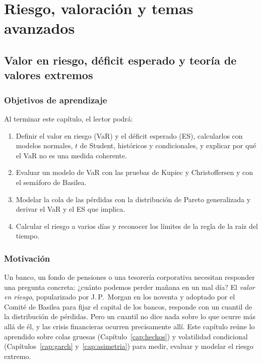 \part{Riesgo, valoración y temas avanzados}
\chapter[Valor en riesgo y valores extremos]{Valor en riesgo, déficit esperado y teoría de valores extremos}\label{cap:var_riesgo}

\section*{Objetivos de aprendizaje}
Al terminar este capítulo, el lector podrá:
\begin{enumerate}[label=\arabic*.,leftmargin=*]
  \item Definir el valor en riesgo (VaR) y el déficit esperado (ES), calcularlos con modelos normales, $t$ de
        Student, históricos y condicionales, y explicar por qué el VaR no es una medida coherente.
  \item Evaluar un modelo de VaR con las pruebas de Kupiec y Christoffersen y con el semáforo de Basilea.
  \item Modelar la cola de las pérdidas con la distribución de Pareto generalizada y derivar el VaR y el ES
        que implica.
  \item Calcular el riesgo a varios días y reconocer los límites de la regla de la raíz del tiempo.
\end{enumerate}

\section*{Motivación}
Un banco, un fondo de pensiones o una tesorería corporativa necesitan responder una pregunta concreta: ¿cuánto
podemos perder mañana en un mal día? El \emph{valor en riesgo}, popularizado por J.\,P.~Morgan en los noventa y
adoptado por el Comité de Basilea para fijar el capital de los bancos, responde con un cuantil de la distribución
de pérdidas. Pero un cuantil no dice nada sobre lo que ocurre más allá de él, y las crisis financieras ocurren
precisamente allí. Este capítulo reúne lo aprendido sobre colas gruesas (Capítulo~\ref{cap:hechos}) y volatilidad
condicional (Capítulos~\ref{cap:garch} y~\ref{cap:asimetria}) para medir, evaluar y modelar el riesgo extremo.

